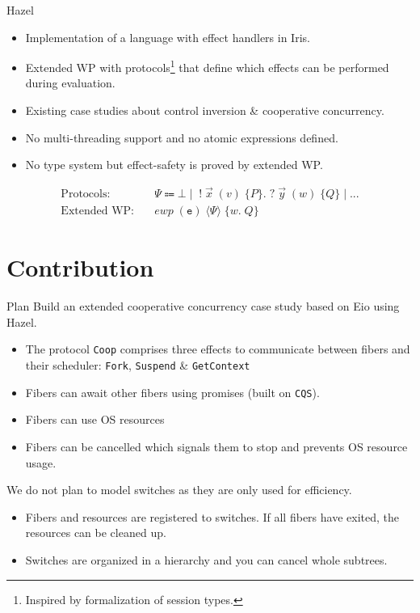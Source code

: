\documentclass[aspectratio=43]{beamer}
\newcommand{\ocaml}[1]{\texttt{#1}}
\newcommand{\proto}{\texttt{Coop}}
\newcommand{\ewp}[3]{\textit{ewp}\; (#1)\; \langle #2 \rangle\; \{#3\}}
\begin{document}
\begin{frame}{Hazel}
    \begin{itemize}
        \item Implementation of a language with effect handlers in Iris.
        \item Extended WP with protocols\footnote{Inspired by formalization of session types.} that define which effects can be performed during evaluation.
        \item Existing case studies about control inversion \& cooperative concurrency.
        \item No multi-threading support and no atomic expressions defined.
        \item No type system but effect-safety is proved by extended WP.
    \end{itemize}
    \begin{align*}
        \text{Protocols:}   & \quad \Psi \Coloneqq \bot \mid\; !\; \vec{x}\; (v)\; \{ P \}.\; ?\; \vec{y}\; (w)\; \{ Q \} \mid ... \\
        \text{Extended WP:} & \quad \ewp{\texttt{e}}{\Psi}{w.\; Q}
    \end{align*}
\end{frame}

\section{Contribution}

\begin{frame}{Plan}
    Build an extended cooperative concurrency case study based on Eio using Hazel.
    \begin{itemize}
        \item The protocol \proto{} comprises three effects to communicate between fibers and their scheduler: \ocaml{Fork}, \ocaml{Suspend} \& \ocaml{GetContext}
        \item Fibers can await other fibers using promises (built on \ocaml{CQS}).
        \item Fibers can use OS resources
        \item Fibers can be cancelled which signals them to stop and prevents OS resource usage.
    \end{itemize}
    We do not plan to model switches as they are only used for efficiency.
    \begin{itemize}
        \item Fibers and resources are registered to switches. If all fibers have exited, the resources can be cleaned up.
        \item Switches are organized in a hierarchy and you can cancel whole subtrees.
    \end{itemize}
\end{frame}
\end{document}

